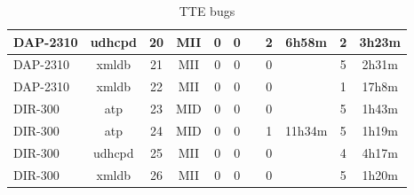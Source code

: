 \begin{table}[ht]
\begin{tabular}{|l||c|c|c|c|c|c|c|c|c|c|}
\hline
DAP-2310 & udhcpd & 20 & MII & 0 & 0 &  & 2 & 6h58m & 2 & 3h23m \\
\hline
DAP-2310 & xmldb & 21 & MII & 0 & 0 &  & 0 &  & 5 & 2h31m \\
\hline
DAP-2310 & xmldb & 22 & MII & 0 & 0 &  & 0 &  & 1 & 17h8m \\
\hline
DIR-300 & atp & 23 & MID & 0 & 0 &  & 0 &  & 5 & 1h43m \\
\hline
DIR-300 & atp & 24 & MID & 0 & 0 &  & 1 & 11h34m & 5 & 1h19m \\
\hline
DIR-300 & udhcpd & 25 & MII & 0 & 0 &  & 0 &  & 4 & 4h17m \\
\hline
DIR-300 & xmldb & 26 & MII & 0 & 0 &  & 0 &  & 5 & 1h20m \\
\hline
\end{tabular}
\caption{TTE bugs}
\end{table}
